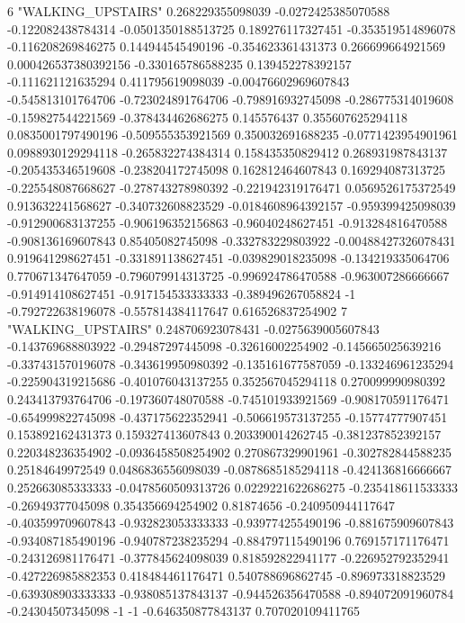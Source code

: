 6 "WALKING_UPSTAIRS" 0.268229355098039 -0.0272425385070588 -0.122082438784314 -0.0501350188513725 0.189276117327451 -0.353519514896078 -0.116208269846275 0.144944545490196 -0.354623361431373 0.266699664921569 0.000426537380392156 -0.330165786588235 0.139452278392157 -0.111621121635294 0.411795619098039 -0.00476602969607843 -0.545813101764706 -0.723024891764706 -0.798916932745098 -0.286775314019608 -0.159827544221569 -0.378434462686275 0.145576437 0.355607625294118 0.0835001797490196 -0.509555353921569 0.350032691688235 -0.0771423954901961 0.0988930129294118 -0.265832274384314 0.158435350829412 0.268931987843137 -0.205435346519608 -0.238204172745098 0.162812464607843 0.169294087313725 -0.225548087668627 -0.278743278980392 -0.221942319176471 0.0569526175372549 0.913632241568627 -0.340732608823529 -0.0184608964392157 -0.959399425098039 -0.912900683137255 -0.906196352156863 -0.96040248627451 -0.913284816470588 -0.908136169607843 0.85405082745098 -0.332783229803922 -0.00488427326078431 0.919641298627451 -0.331891138627451 -0.039829018235098 -0.134219335064706 0.770671347647059 -0.796079914313725 -0.996924786470588 -0.963007286666667 -0.914914108627451 -0.917154533333333 -0.389496267058824 -1 -0.792722638196078 -0.557814384117647 0.616526837254902
7 "WALKING_UPSTAIRS" 0.248706923078431 -0.0275639005607843 -0.143769688803922 -0.29487297445098 -0.32616002254902 -0.145665025639216 -0.337431570196078 -0.343619950980392 -0.135161677587059 -0.133246961235294 -0.225904319215686 -0.401076043137255 0.352567045294118 0.270099990980392 0.243413793764706 -0.197360748070588 -0.745101933921569 -0.908170591176471 -0.654999822745098 -0.437175622352941 -0.506619573137255 -0.15774777907451 0.153892162431373 0.159327413607843 0.203390014262745 -0.381237852392157 0.220348236354902 -0.0936458508254902 0.270867329901961 -0.302782844588235 0.25184649972549 0.0486836556098039 -0.0878685185294118 -0.424136816666667 0.252663085333333 -0.0478560509313726 0.0229221622686275 -0.235418611533333 -0.26949377045098 0.354356694254902 0.81874656 -0.240950944117647 -0.403599709607843 -0.932823053333333 -0.939774255490196 -0.881675909607843 -0.934087185490196 -0.940787238235294 -0.884797115490196 0.769157171176471 -0.243126981176471 -0.377845624098039 0.818592822941177 -0.226952792352941 -0.427226985882353 0.418484461176471 0.540788696862745 -0.896973318823529 -0.639308903333333 -0.938085137843137 -0.944526356470588 -0.894072091960784 -0.24304507345098 -1 -1 -0.646350877843137 0.707020109411765
